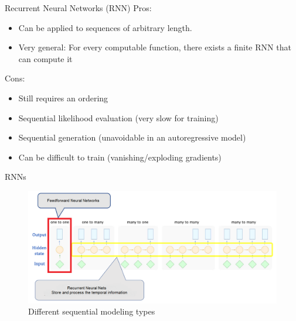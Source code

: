 \begin{frame}[allowframebreaks]{Recurrent Neural Networks (RNN)}
\framebreak
Pros:
\begin{itemize}
    \item Can be applied to sequences of arbitrary length.
    \item Very general: For every computable function, there exists a finite RNN that can compute it
\end{itemize}
\vskip 10pt
Cons:
\begin{itemize}
    \item Still requires an ordering
    \item Sequential likelihood evaluation (very slow for training)
    \item Sequential generation (unavoidable in an autoregressive model)
    \item Can be difficult to train (vanishing/exploding gradients)
\end{itemize}
\end{frame}

\begin{frame}{RNNs}

\framebreak
\begin{figure}
    \centering
    \includegraphics[height=0.9\textheight, width=\textwidth, keepaspectratio]{images/arm/rnn_types.png}
    \caption{Different sequential modeling types}
\end{figure}
    
\end{frame}

